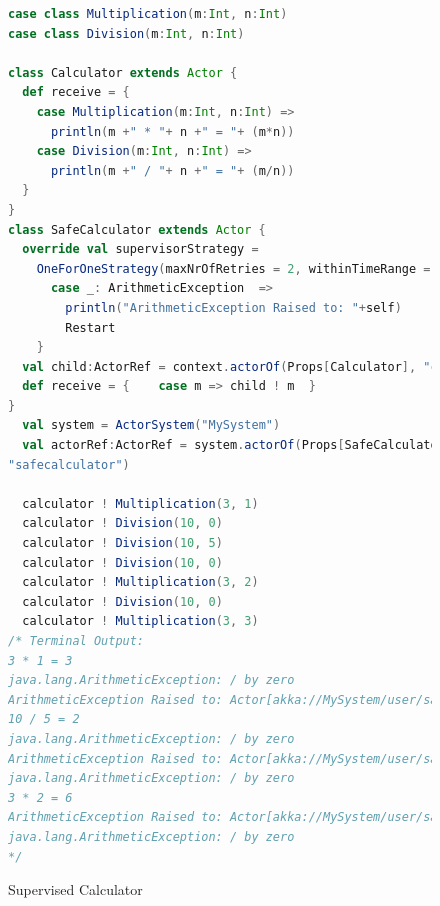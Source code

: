 \begin{figure}[p]
\label{supervisedcalculator}

  \begin{lstlisting}[language=scala]
case class Multiplication(m:Int, n:Int)
case class Division(m:Int, n:Int)

class Calculator extends Actor {
  def receive = {
    case Multiplication(m:Int, n:Int) =>
      println(m +" * "+ n +" = "+ (m*n))
    case Division(m:Int, n:Int) =>
      println(m +" / "+ n +" = "+ (m/n))
  }
}
class SafeCalculator extends Actor {
  override val supervisorStrategy =
    OneForOneStrategy(maxNrOfRetries = 2, withinTimeRange = 1 minute) {
      case _: ArithmeticException  =>
        println("ArithmeticException Raised to: "+self)
        Restart
    }
  val child:ActorRef = context.actorOf(Props[Calculator], "child")
  def receive = {    case m => child ! m  }
}
  val system = ActorSystem("MySystem")
  val actorRef:ActorRef = system.actorOf(Props[SafeCalculator],
"safecalculator")

  calculator ! Multiplication(3, 1)
  calculator ! Division(10, 0)
  calculator ! Division(10, 5)
  calculator ! Division(10, 0)
  calculator ! Multiplication(3, 2)
  calculator ! Division(10, 0)
  calculator ! Multiplication(3, 3)
/* Terminal Output:
3 * 1 = 3
java.lang.ArithmeticException: / by zero
ArithmeticException Raised to: Actor[akka://MySystem/user/safecalculator]
10 / 5 = 2
java.lang.ArithmeticException: / by zero
ArithmeticException Raised to: Actor[akka://MySystem/user/safecalculator]
java.lang.ArithmeticException: / by zero
3 * 2 = 6
ArithmeticException Raised to: Actor[akka://MySystem/user/safecalculator]
java.lang.ArithmeticException: / by zero
*/
    \end{lstlisting}
  \caption{Supervised Calculator}
\end{figure}




